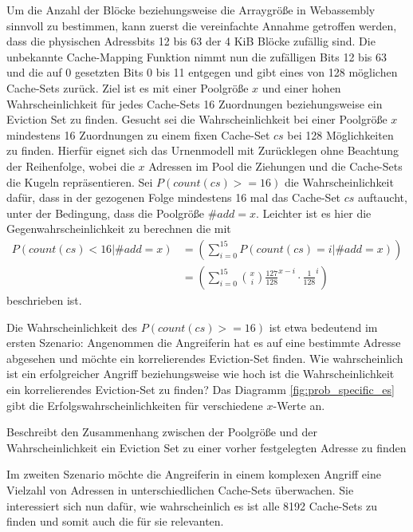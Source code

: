 Um die Anzahl der Blöcke beziehungsweise die Arraygröße in Webassembly sinnvoll zu bestimmen, kann zuerst die vereinfachte Annahme getroffen werden, dass die physischen Adressbits 12 bis 63 der 4 KiB Blöcke zufällig sind. 
Die unbekannte Cache-Mapping Funktion nimmt nun die zufälligen Bits 12 bis 63 und die auf 0 gesetzten Bits 0 bis 11 entgegen und gibt eines von 128 möglichen Cache-Sets zurück.
Ziel ist es mit einer Poolgröße $x$ und einer hohen Wahrscheinlichkeit für jedes Cache-Sets 16 Zuordnungen beziehungsweise ein Eviction Set zu finden.
Gesucht sei die Wahrscheinlichkeit bei einer Poolgröße $x$ mindestens 16 Zuordnungen zu einem fixen Cache-Set $cs$ bei 128 Möglichkeiten zu finden.
Hierfür eignet sich das Urnenmodell mit Zurücklegen ohne Beachtung der Reihenfolge, wobei die $x$ Adressen im Pool die Ziehungen und die Cache-Sets die Kugeln repräsentieren. Sei $P(count(cs)>=16)$ die Wahrscheinlichkeit dafür, dass in der gezogenen Folge mindestens 16 mal das Cache-Set $cs$ auftaucht, unter der Bedingung, dass die Poolgröße $\#add = x$.
Leichter ist es hier die Gegenwahrscheinlichkeit zu berechnen die mit
\begin{align*}
P(count(cs)<16|\#add = x) &=
\left( \sum\limits_{i=0}^{15}P(count(cs)=i|\#add = x) \right) \\&=
\left( \sum\limits_{i=0}^{15} {x \choose i} \frac{127}{128}^{x-i} \cdot \frac{1}{128}^i  \right)
\end{align*}
beschrieben ist.

Die Wahrscheinlichkeit des $P(count(cs)>=16)$ ist etwa bedeutend im ersten Szenario:
Angenommen die Angreiferin hat es auf eine bestimmte Adresse abgesehen und möchte ein korrelierendes Eviction-Set finden. 
Wie wahrscheinlich ist ein erfolgreicher Angriff beziehungsweise wie hoch ist die Wahrscheinlichkeit ein korrelierendes Eviction-Set zu finden? 
Das Diagramm \ref{fig:prob_specific_es} gibt die Erfolgswahrscheinlichkeiten für verschiedene $x$-Werte an.
\label{fig:prob_specific_es}
\begin{center}
\begin{scaletikzpicturetowidth}{\textwidth}

\caption{Beschreibt den Zusammenhang zwischen der Poolgröße und der Wahrscheinlichkeit ein Eviction Set zu einer vorher festgelegten Adresse zu finden}
\end{scaletikzpicturetowidth}
\end{center}
Im zweiten Szenario möchte die Angreiferin in einem komplexen Angriff eine Vielzahl von Adressen in unterschiedlichen Cache-Sets überwachen. 
Sie interessiert sich nun dafür, wie wahrscheinlich es ist alle 8192 Cache-Sets zu finden und somit auch die für sie relevanten. 

